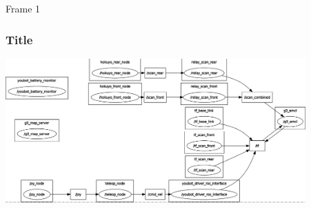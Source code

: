 
\begin{frame}{Frame 1}
\frametitle {Title}
 
	\centering
    \includegraphics[height=55mm]{slides/gfx/rqt_graph.png}
 
\end{frame}